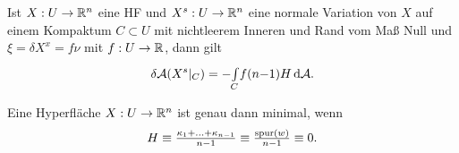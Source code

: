 \documentclass{cheat-sheet}
\newcommand{\A}{\mathcal{A}}
\begin{document}
\begin{satz}
  Ist $X : U \to \mathbb{R}^n$ eine HF und $X^s : U \to \mathbb{R}^n$ eine normale Variation von $X$ auf einem Kompaktum $C \subset U$ mit nichtleerem Inneren und Rand vom Maß Null und $\xi = \delta X^x = f \nu$ mit $f : U \to \mathbb{R}$, dann gilt
  \[ \delta \A(X^s|_C) = - \Int{C}{}{f (n{-}1) H}{\A}. \]
\end{satz}

\begin{satz}
  Eine Hyperfläche $X : U \to \mathbb{R}^n$ ist genau dann minimal, wenn
  \[ H \equiv \tfrac{\kappa_1 + ... + \kappa_{n{-}1}}{n-1} \equiv \tfrac{\mathrm{spur}(w)}{n-1} \equiv 0. \]
\end{satz}


\end{document}
